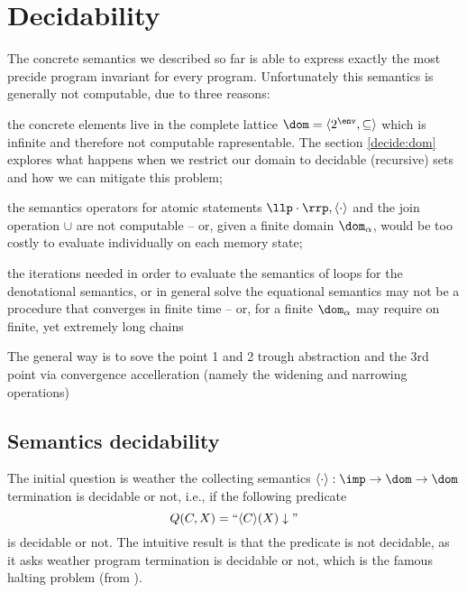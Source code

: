 \section{Decidability}
The concrete semantics we described so far is able to express exactly
the most precide program invariant for every program. Unfortunately
this semantics is generally not computable, due to three reasons:

\begin{problem}\label{problem:domain}
  the concrete elements live in the complete lattice \(\dom = \langle
  2^\env, \subseteq \rangle\) which is infinite and therefore not
  computable rapresentable. The section \ref{decide:dom} explores what
  happens when we restrict our domain to decidable (recursive) sets
  and how we can mitigate this problem;
\end{problem}

\begin{problem}\label{problem:operations}
  the semantics operators for atomic statements \(\llp \cdot \rrp,
  \langle \cdot \rangle\) and the join operation \(\cup\) are not
  computable -- or, given a finite domain \(\dom_\alpha\), would be
  too costly to evaluate individually on each memory state;
\end{problem}

\begin{problem}\label{problem:exploration}
  the iterations needed in order to evaluate the semantics of loops
  for the denotational semantics, or in general solve the equational
  semantics may not be a procedure that converges in finite time --
  or, for a finite \(\dom_\alpha\) may require on finite, yet
  extremely long chains
\end{problem}

The general way is to sove the point 1 and 2 trough abstraction and
the 3rd point via convergence accelleration (namely the widening and
narrowing operations)

\subsection{Semantics decidability}\label{decide:sem}
The initial question is weather the collecting semantics \(\langle
\cdot \rangle : \imp \to \dom \to \dom\) termination is decidable or
not, i.e., if the following predicate \[Q(C,X) = ``\langle C \rangle
(X) \downarrow\text{''}\] is decidable or not. The intuitive result is
that the predicate is not decidable, as it asks weather program
termination is decidable or not, which is the famous halting problem
(from \cite{turing1936computable}).

